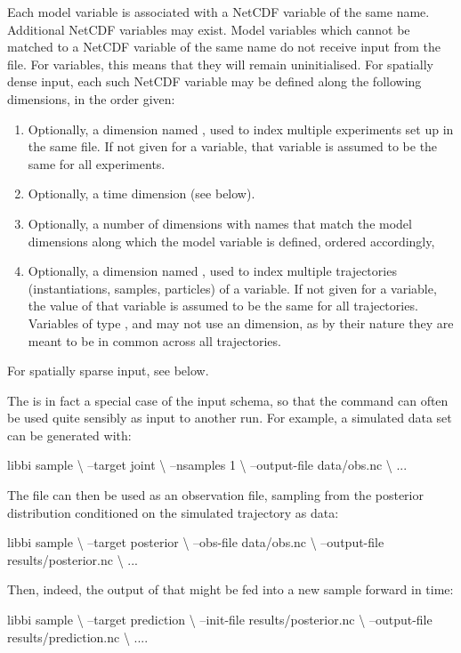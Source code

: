Each model variable is associated with a NetCDF variable of the same
name. Additional NetCDF variables may exist. Model variables which cannot be
matched to a NetCDF variable of the same name do not receive input from the
file. For  variables, this means that they will remain
uninitialised. For spatially dense input, each such NetCDF variable may be
defined along the following dimensions, in the order given:
\begin{enumerate}
\item Optionally, a dimension named , used to index multiple
  experiments set up in the same file. If not given for a variable, that
  variable is assumed to be the same for all experiments.
\item Optionally, a time dimension (see below).
\item Optionally, a number of dimensions with names that match the model
  dimensions along which the model variable is defined, ordered accordingly,
\item Optionally, a dimension named , used to index multiple
  trajectories (instantiations, samples, particles) of a variable. If not
  given for a variable, the value of that variable is assumed to be the same
  for all trajectories. Variables of type ,  and
   may not use an  dimension, as by their nature they are
  meant to be in common across all trajectories.
\end{enumerate}

For spatially sparse input, see  below.

\begin{tip}
The  is in fact a special case of
the input schema, so that the  command can often be used
quite sensibly as input to another run. For example, a simulated data set can
be generated with:
\begin{cmdcode}
libbi sample \textbackslash
    --target joint \textbackslash
    --nsamples 1 \textbackslash
    --output-file data/obs.nc \textbackslash
    ...
\end{cmdcode}
The  file can then be used as an observation file, sampling
from the posterior distribution conditioned on the simulated trajectory as
data:
\begin{cmdcode}
libbi sample \textbackslash
    --target posterior \textbackslash
    --obs-file data/obs.nc \textbackslash
    --output-file results/posterior.nc \textbackslash
    ...
\end{cmdcode}
Then, indeed, the output of that might be fed into a new sample forward in
time:
\begin{cmdcode}
libbi sample \textbackslash
    --target prediction \textbackslash
    --init-file results/posterior.nc \textbackslash
    --output-file results/prediction.nc \textbackslash
    ....
\end{cmdcode}
\end{tip}

